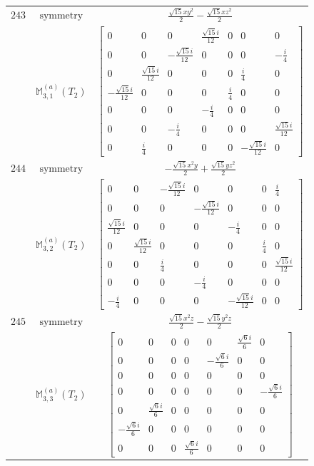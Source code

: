 \documentclass[fleqn,8pt,landscape]{jsarticle}
\begin{document}
\begin{longtable}{ccc}
$ 243 $ & $ \text{symmetry} $ & $ \frac{\sqrt{15} x y^{2}}{2} - \frac{\sqrt{15} x z^{2}}{2} $ \\
$  $ & $ \mathbb{M}_{3,1}^{(a)}(T_{2}) $ & $ \begin{bmatrix} 0 & 0 & 0 & \frac{\sqrt{15} i}{12} & 0 & 0 & 0 \\ 0 & 0 & - \frac{\sqrt{15} i}{12} & 0 & 0 & 0 & - \frac{i}{4} \\ 0 & \frac{\sqrt{15} i}{12} & 0 & 0 & 0 & \frac{i}{4} & 0 \\ - \frac{\sqrt{15} i}{12} & 0 & 0 & 0 & \frac{i}{4} & 0 & 0 \\ 0 & 0 & 0 & - \frac{i}{4} & 0 & 0 & 0 \\ 0 & 0 & - \frac{i}{4} & 0 & 0 & 0 & \frac{\sqrt{15} i}{12} \\ 0 & \frac{i}{4} & 0 & 0 & 0 & - \frac{\sqrt{15} i}{12} & 0 \end{bmatrix} $ \\ \hline
$ 244 $ & $ \text{symmetry} $ & $ - \frac{\sqrt{15} x^{2} y}{2} + \frac{\sqrt{15} y z^{2}}{2} $ \\
$  $ & $ \mathbb{M}_{3,2}^{(a)}(T_{2}) $ & $ \begin{bmatrix} 0 & 0 & - \frac{\sqrt{15} i}{12} & 0 & 0 & 0 & \frac{i}{4} \\ 0 & 0 & 0 & - \frac{\sqrt{15} i}{12} & 0 & 0 & 0 \\ \frac{\sqrt{15} i}{12} & 0 & 0 & 0 & - \frac{i}{4} & 0 & 0 \\ 0 & \frac{\sqrt{15} i}{12} & 0 & 0 & 0 & \frac{i}{4} & 0 \\ 0 & 0 & \frac{i}{4} & 0 & 0 & 0 & \frac{\sqrt{15} i}{12} \\ 0 & 0 & 0 & - \frac{i}{4} & 0 & 0 & 0 \\ - \frac{i}{4} & 0 & 0 & 0 & - \frac{\sqrt{15} i}{12} & 0 & 0 \end{bmatrix} $ \\ \hline
$ 245 $ & $ \text{symmetry} $ & $ \frac{\sqrt{15} x^{2} z}{2} - \frac{\sqrt{15} y^{2} z}{2} $ \\
$  $ & $ \mathbb{M}_{3,3}^{(a)}(T_{2}) $ & $ \begin{bmatrix} 0 & 0 & 0 & 0 & 0 & \frac{\sqrt{6} i}{6} & 0 \\ 0 & 0 & 0 & 0 & - \frac{\sqrt{6} i}{6} & 0 & 0 \\ 0 & 0 & 0 & 0 & 0 & 0 & 0 \\ 0 & 0 & 0 & 0 & 0 & 0 & - \frac{\sqrt{6} i}{6} \\ 0 & \frac{\sqrt{6} i}{6} & 0 & 0 & 0 & 0 & 0 \\ - \frac{\sqrt{6} i}{6} & 0 & 0 & 0 & 0 & 0 & 0 \\ 0 & 0 & 0 & \frac{\sqrt{6} i}{6} & 0 & 0 & 0 \end{bmatrix} $ \\ \hline

\end{longtable}
\end{document}
